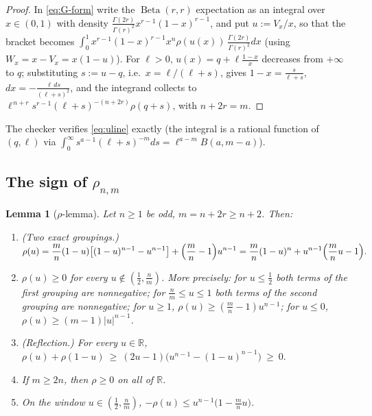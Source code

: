 \documentclass[11pt]{article}
\newtheorem{lemma}[theorem]{Lemma}
\newcommand{\R}{\mathbb R}
\newcommand{\Betad}{\operatorname{Beta}}
\begin{document}
\begin{proof}
In \eqref{eq:G-form} write the $\Betad(r,r)$ expectation as an integral over $x\in(0,1)$ with density $\frac{\Gamma(2r)}{\Gamma(r)^2}x^{r-1}(1-x)^{r-1}$, and put $u:=V_x/x$, so that the bracket becomes $\int_0^1 x^{r-1}(1-x)^{r-1}x^n\rho(u(x))\,\frac{\Gamma(2r)}{\Gamma(r)^2}dx$ (using $W_x=x-V_x=x(1-u)$).  For $\ell>0$, $u(x)=q+\ell\frac{1-x}x$ decreases from $+\infty$ to $q$; substituting $s:=u-q$, i.e.\ $x=\ell/(\ell+s)$, gives $1-x=\frac{s}{\ell+s}$, $dx=-\frac{\ell\,ds}{(\ell+s)^2}$, and the integrand collects to $\ell^{\,n+r}s^{r-1}(\ell+s)^{-(n+2r)}\rho(q+s)$, with $n+2r=m$.
\end{proof}

The checker verifies \eqref{eq:uline} exactly (the integral is a rational function of $(q,\ell)$ via $\int_0^\infty s^{a-1}(\ell+s)^{-m}ds=\ell^{a-m}B(a,m-a)$).

\subsection{The sign of $\rho_{n,m}$}

\begin{lemma}[$\rho$-lemma]\label{lem:rho}
Let $n\ge1$ be odd, $m=n+2r\ge n+2$.  Then:
\begin{enumerate}[label=\textup{(\roman*)}]
\item\label{rho-i} \emph{(Two exact groupings.)}
$\displaystyle \rho(u)=\frac mn(1-u)\bigl[(1-u)^{n-1}-u^{n-1}\bigr]+\Bigl(\frac mn-1\Bigr)u^{n-1}
=\frac mn(1-u)^n+u^{n-1}\Bigl(\frac mn u-1\Bigr).$
\item\label{rho-ii} $\rho(u)\ge0$ for every $u\notin(\tfrac12,\tfrac nm)$.  More precisely: for $u\le\tfrac12$ both terms of the first grouping are nonnegative; for $\tfrac nm\le u\le1$ both terms of the second grouping are nonnegative; for $u\ge1$, $\rho(u)\ge(\tfrac mn-1)u^{n-1}$; for $u\le0$, $\rho(u)\ge(m-1)|u|^{n-1}$.
\item\label{rho-iii} \emph{(Reflection.)} For every $u\in\R$,
$\rho(u)+\rho(1-u)\ \ge\ (2u-1)\bigl(u^{n-1}-(1-u)^{n-1}\bigr)\ \ge\ 0 .$
\item\label{rho-iv} If $m\ge2n$, then $\rho\ge0$ on all of $\R$.
\item\label{rho-v} On the window $u\in(\tfrac12,\tfrac nm)$,
$-\rho(u)\le u^{n-1}\bigl(1-\tfrac mnu\bigr)$.
\end{enumerate}
\end{lemma}
\end{document}
